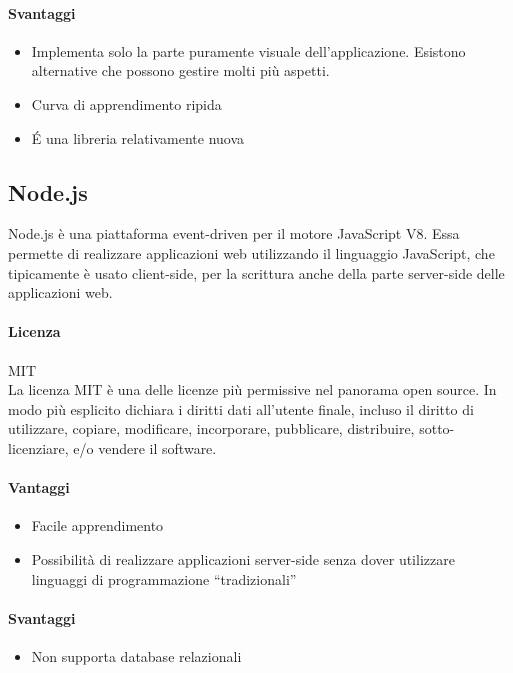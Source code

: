 \paragraph{Svantaggi} 
\begin{itemize}
	\item Implementa solo la parte puramente visuale
     dell'applicazione. Esistono alternative che possono gestire molti
     più aspetti.
	\item Curva di apprendimento ripida
	\item \'E una libreria relativamente nuova
\end{itemize}

\subsection{Node.js}

Node.js è una piattaforma event-driven per il motore JavaScript
V8. Essa permette di realizzare applicazioni web utilizzando il
linguaggio JavaScript, che tipicamente è usato client-side, per la scrittura anche
della parte server-side delle applicazioni web. 
\\
\paragraph{Licenza} MIT \\
La licenza MIT è una delle licenze più permissive nel panorama open
source. In modo più esplicito dichiara i diritti dati all'utente
finale, incluso il diritto di utilizzare, copiare, modificare,
incorporare, pubblicare, distribuire, sotto-licenziare, e/o vendere il
software. \\

\paragraph{Vantaggi}
\begin{itemize}
	\item Facile apprendimento
	\item Possibilità di realizzare applicazioni server-side senza
     dover utilizzare linguaggi di programmazione “tradizionali”
\end{itemize}

\paragraph{Svantaggi} 
\begin{itemize}
	\item Non supporta database relazionali
	
\end{itemize}

